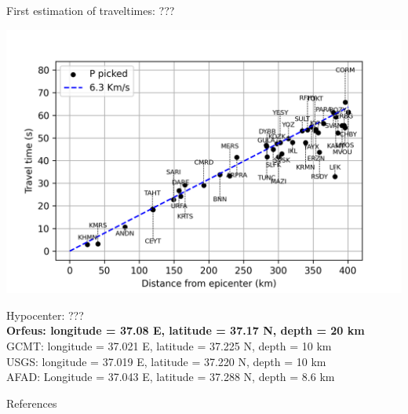 \documentclass{beamer}
\newcommand\dirbiblio{../../biblio}
\begin{document}
\begin{frame}
 {First estimation of traveltimes: ???}
 
 \begin{center}
 \vskip -0.5cm \includegraphics[width=0.9\linewidth]{images/tt_p.png}  
 \end{center}

 \vskip -0.5cm
 {\scriptsize
 Hypocenter: ??? \\
 {\bf Orfeus: longitude = 37.08 E, latitude = 37.17 N, depth = 20 km} \\ 
 GCMT: longitude = 37.021 E, latitude = 37.225 N, depth = 10 km \\
 USGS: longitude = 37.019 E, latitude = 37.220 N, depth = 10 km \\
 AFAD: Longitude = 37.043 E, latitude = 37.288 N, depth = 8.6 km \\
 }
 
\end{frame}



\begin{frame}
 {References}
 
    							    

\end{frame}
\end{document}
